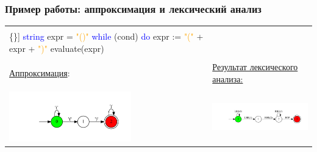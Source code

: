 \documentclass{beamer}
\begin{document}
\begin{frame}[fragile]
    \transwipe[direction=90]
    \frametitle{Пример работы: аппроксимация и лексический анализ}    
\begin{center}
    \begin{tabular}{p{6cm} p{6cm}}
    \begin{minipage}{3in}

        \begin{Verbatim}[commandchars=\\\{\}]
\textcolor{blue}{string} expr = \textcolor{orange}{"()"}
\textcolor{blue}{while} (cond) \textcolor{blue}{do} 
    expr := \textcolor{orange}{"("} + expr + \textcolor{orange}{")"}
evaluate(expr)  
        \end{Verbatim}
    \end{minipage}
&
\\ &
\\     
\underline{Аппроксимация}: & \underline{Результат лексического анализа:}
\\ &
\\
\includegraphics[width=150pt]{pictures/in3_appr.pdf}
&
\includegraphics[width=160pt]{pictures/in3.pdf}

    \end{tabular}
\end{center}
\end{frame}
\end{document}
